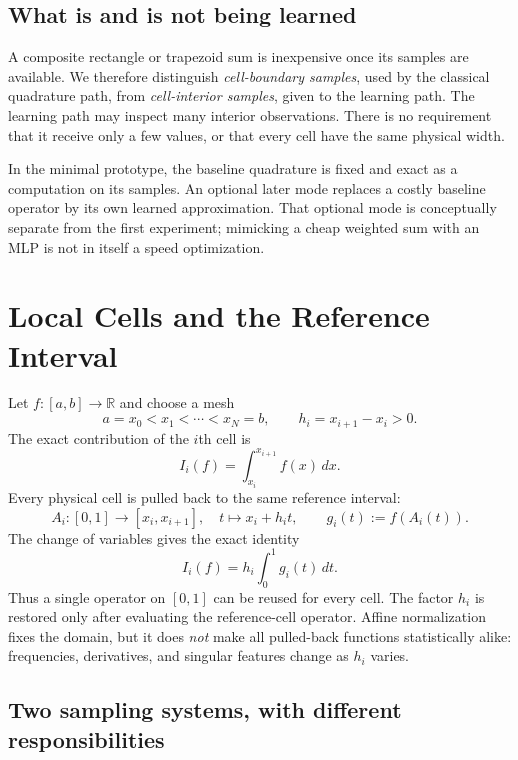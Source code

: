 \subsection{What is and is not being learned}

A composite rectangle or trapezoid sum is inexpensive once its samples are
available. We therefore distinguish \emph{cell-boundary samples}, used by the
classical quadrature path, from \emph{cell-interior samples}, given to the
learning path. The learning path may inspect many interior observations. There
is no requirement that it receive only a few values, or that every cell have
the same physical width.

In the minimal prototype, the baseline quadrature is fixed and exact as a
computation on its samples. An optional later mode replaces a costly baseline
operator by its own learned approximation.
That optional mode is conceptually
separate from the first experiment; mimicking a cheap weighted sum with an MLP
is not in itself a speed optimization.

\section{Local Cells and the Reference Interval}
\label{sec:resop-reference}

Let $f:[a,b]\to\mathbb R$ and choose a mesh
\[
    a=x_0<x_1<\cdots<x_N=b,\qquad h_i=x_{i+1}-x_i>0.
\]
The exact contribution of the $i$th cell is
\[
    I_i(f)=\int_{x_i}^{x_{i+1}}f(x)\,dx.
\]
Every physical cell is pulled back to the same reference interval:
\begin{equation}
    A_i:[0,1]\longrightarrow[x_i,x_{i+1}],
    \quad t\longmapsto x_i+h_it,
    \qquad g_i(t):=f(A_i(t)).
    \label{eq:resop-affine}
\end{equation}
The change of variables gives the exact identity
\begin{equation}
    \boxed{I_i(f)=h_i\int_0^1 g_i(t)\,dt.}
    \label{eq:resop-cell-integral}
\end{equation}
Thus a single operator on $[0,1]$ can be reused for every cell. The factor
$h_i$ is restored only after evaluating the reference-cell operator.
Affine normalization fixes the domain, but it does \emph{not} make all
pulled-back functions statistically alike: frequencies, derivatives, and
singular features change as $h_i$ varies.

\subsection{Two sampling systems, with different responsibilities}
\label{sec:resop-two-samplings}

